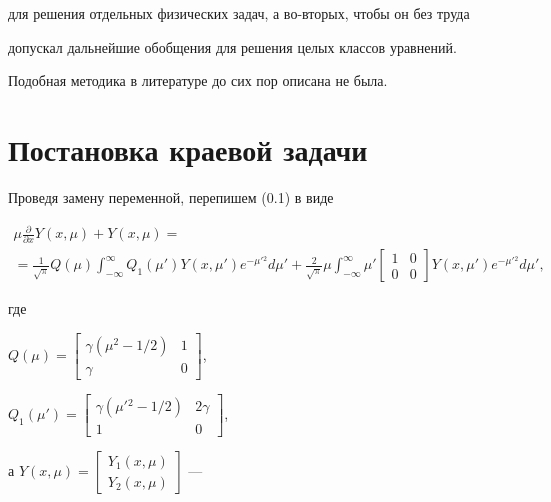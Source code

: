 для решения отдельных физических задач, а во-вторых, чтобы он без труда 


допускал дальнейшие обобщения для решения целых классов уравнений. 


Подобная методика в литературе до сих пор описана не была. 


 


 


\section{Постановка краевой задачи} 


 


Проведя замену переменной, перепишем (0.1) в виде 


\begin{multline} 


\mu\frac{\partial}{\partial x}Y(x,\mu)+Y(x,\mu)= \\ =\frac{1}{\sqrt{\pi}} 


Q(\mu)\int^\infty_{-\infty}Q_1(\mu')Y(x,\mu') 


e^{-\mu'{}^2}d\mu'+\frac{2}{\sqrt{\pi}}\mu 


\int^\infty_{-\infty}\mu'\begin{bmatrix} 


1 & 0 \\ 0 & 0 \end{bmatrix} Y(x,\mu')e^{-\mu'{}^2}d\mu', 


\end{multline} 


где 


$Q(\mu)=\left[\begin{smallmatrix} \gamma(\mu^2-1/2) & 1 \\ \gamma & 0 


\end{smallmatrix}\right]$, 


$Q_1(\mu')=\left[\begin{smallmatrix} \gamma(\mu'{}^2-1/2) & 2\gamma \\ 1 


& 0 \end{smallmatrix}\right]$, 


а $Y(x,\mu)=\left[\begin{smallmatrix} Y_1(x,\mu) 


\\ Y_2(x,\mu)\end{smallmatrix}\right]$ --- 



